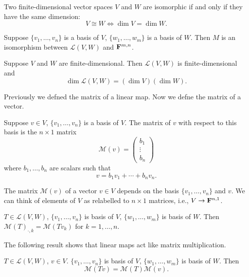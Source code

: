 \begin{lemma}
Two finite-dimensional vector spaces $V$ and $W$ are isomorphic if and only if they have the same dimension:
\[V\cong W\iff\dim V=\dim W.\]
\end{lemma}

\begin{proposition}
Suppose $\{v_1,\dots,v_n\}$ is a basis of $V$, $\{w_1,\dots,w_m\}$ is a basis of $W$. Then $M$ is an isomorphism between $\mathcal{L}(V,W)$ and $\mathbf F^{m,n}$.
\end{proposition}

\begin{corollary}\label{cor:dimension-product}
Suppose $V$ and $W$ are finite-dimensional. Then $\mathcal{L}(V,W)$ is finite-dimensional and
\[\dim\mathcal{L}(V,W)=(\dim V)(\dim W).\]
\end{corollary}

Previously we defned the matrix of a linear map. Now we defne the matrix of a vector.

\begin{definition}
Suppose $v\in V$, $\{v_1,\dots,v_n\}$ is a basis of $V$. The matrix of $v$ with respect to this basis is the $n\times1$ matrix
\[\mathcal{M}(v)=\begin{pmatrix}
b_1\\\vdots\\b_n
\end{pmatrix}\]
where $b_1,\dots,b_n$ are scalars such that
\[v=b_1v_1+\cdots+b_nv_n.\]
\end{definition}

\begin{remark}
The matrix $\mathcal{M}(v)$ of a vector $v\in V$ depends on the basis $\{v_1,\dots,v_n\}$ and $v$. We can think of elements of $V$ as relabelled to $n\times1$ matrices, i.e., $V\to\mathbf F^{n,1}$.
\end{remark}

\begin{lemma}
$T\in\mathcal{L}(V,W)$, $\{v_1,\dots,v_n\}$ is basis of $V$, $\{w_1,\dots,w_m\}$ is basis of $W$. Then $\mathcal{M}(T)_{\cdot,k}=\mathcal{M}(Tv_k)$ for $k=1,\dots,n$.
\end{lemma}

The following result shows that linear maps act like matrix multiplication.

\begin{proposition}
$T\in\mathcal{L}(V,W)$, $v\in V$. $\{v_1,\dots,v_n\}$ is basis of $V$, $\{w_1,\dots,w_m\}$ is basis of $W$. Then
\[\mathcal{M}(Tv)=\mathcal{M}(T)\mathcal{M}(v).\]
\end{proposition}

